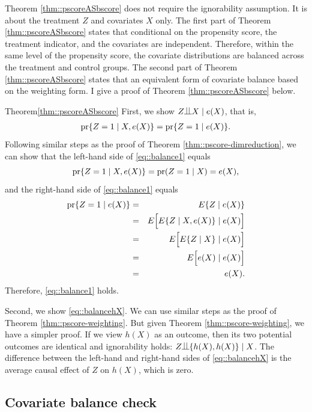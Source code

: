 Theorem \ref{thm::pscoreASbscore} does not require the ignorability assumption. It is about the treatment $Z$ and covariates $X$ only. 
The first part of  Theorem \ref{thm::pscoreASbscore} states that conditional on the propensity score, the treatment indicator, and the covariates are independent. Therefore, within the same level of the propensity score, the covariate distributions are balanced across the treatment and control groups. 
The second part of Theorem \ref{thm::pscoreASbscore} states that an equivalent form of covariate balance based on the weighting form. 
I give a proof of Theorem \ref{thm::pscoreASbscore} below.  


\begin{myproof}{Theorem}{\ref{thm::pscoreASbscore}}
First, we show $Z\ind X \mid e(X)$, that is,
\begin{eqnarray}
\pr\{Z=1\mid X, e(X)\} = \pr\{Z=1\mid  e(X)\}.
\label{eq::balance1}
\end{eqnarray} 
Following similar steps as the proof of Theorem \ref{thm::pscore-dimreduction}, we can show that the left-hand side of \eqref{eq::balance1} equals
$$
\textup{pr}\{Z=1\mid X, e(X)\} = \textup{pr}( Z=1\mid X ) = e(X),
$$
and the right-hand side of \eqref{eq::balance1} equals 
\begin{eqnarray*}
\textup{pr}\{Z=1\mid  e(X)\} &=& E\{  Z\mid  e(X) \}  \\
&=& E\Big[ E\{  Z\mid X,  e(X) \} \mid e(X) \Big] \\
&=& E\Big[ E\{  Z\mid X  \} \mid e(X) \Big] \\
&=& E\Big[ e(X) \mid e(X) \Big] \\
&=& e(X). 
\end{eqnarray*}
Therefore, \eqref{eq::balance1} holds. 

Second, we show \eqref{eq::balancehX}. We can use similar steps as the proof of Theorem \ref{thm::pscore-weighting}. But given Theorem \ref{thm::pscore-weighting}, we have a simpler proof. If we view $h(X)$ as an outcome, then its two potential outcomes are identical and ignorability holds: $Z\ind \{  h(X), h(X) \}  \mid X$. The difference between the left-hand and right-hand sides of \eqref{eq::balancehX} is the average causal effect of $Z$ on $h(X)$, which is zero. 
\end{myproof}





\subsection{Covariate balance check}
\label{sec::balance-check-bmi}

